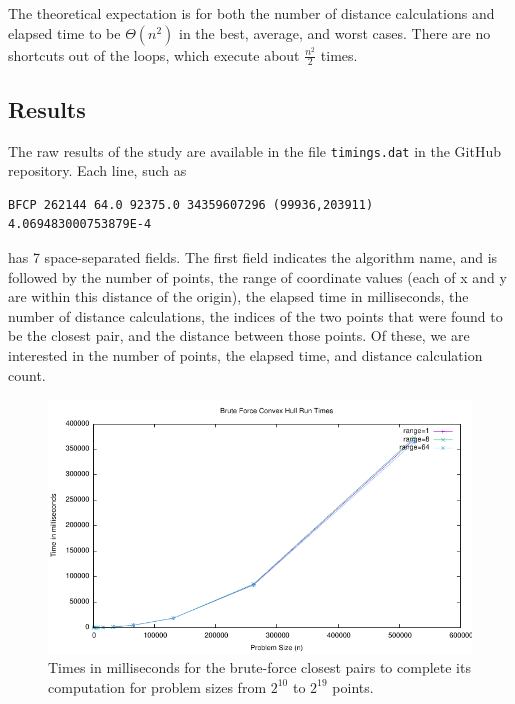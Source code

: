 \documentclass[12pt]{article}
\begin{document}
The theoretical expectation is for both the number of distance
calculations and elapsed time to be $\Theta(n^2)$ in the best,
average, and worst cases.  There are no shortcuts out of the loops,
which execute about $\frac{n^2}{2}$ times.

\subsection{Results}

The raw results of the study are available in the file
\texttt{timings.dat} in the GitHub repository.  Each line, such as

{\small
\begin{verbatim}
BFCP 262144 64.0 92375.0 34359607296 (99936,203911) 4.069483000753879E-4
\end{verbatim}
}

has 7 space-separated fields.  The first field indicates the algorithm name,
and is followed by the number of points, the range of coordinate
values (each of x and y are within this distance of the origin), the
elapsed time in milliseconds, the number of distance calculations, the
indices of the two points that were found to be the closest pair, and
the distance between those points.  Of these, we are interested in the
number of points, the elapsed time, and distance calculation count.

\begin{figure}[htb]
  \centering
  \includegraphics{bfcp-times.pdf}
  \caption{Times in milliseconds for the brute-force closest pairs to
    complete its computation for problem sizes from $2^{10}$ to
    $2^{19}$ points.}
  \label{fig:timings}
\end{figure}
\end{document}
